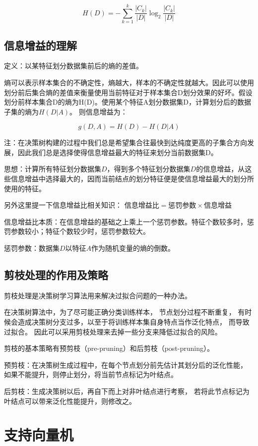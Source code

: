 $$
H(D)=-\sum_{k=1}^{k}\frac{|C_{k}|}{|D|}\log_{2}\frac{|C_{k}|}{|D|}
$$

\subsection{信息增益的理解}

定义：以某特征划分数据集前后的熵的差值。 

熵可以表示样本集合的不确定性，熵越大，样本的不确定性就越大。因此可以使用划分前后集合熵的差值来衡量使用当前特征对于样本集合D划分效果的好坏。假设划分前样本集合D的熵为H(D)。使用某个特征A划分数据集D，计算划分后的数据子集的熵为$H(D|A)$。 则信息增益为：

$$
g(D,A)=H(D)-H(D|A)
$$

注：在决策树构建的过程中我们总是希望集合往最快到达纯度更高的子集合方向发展，因此我们总是选择使得信息增益最大的特征来划分当前数据集D。  

思想：计算所有特征划分数据集$D$，得到多个特征划分数据集$D$的信息增益，从这些信息增益中选择最大的，因而当前结点的划分特征便是使信息增益最大的划分所使用的特征。  

另外这里提一下信息增益比相关知识： $\mbox{信息增益比}=\mbox{惩罚参数}\times\mbox{信息增益}$  

信息增益比本质：在信息增益的基础之上乘上一个惩罚参数。特征个数较多时，惩罚参数较小；特征个数较少时，惩罚参数较大。  

惩罚参数：数据集$D$以特征$A$作为随机变量的熵的倒数。

\subsection{剪枝处理的作用及策略}

剪枝处理是决策树学习算法用来解决过拟合问题的一种办法。

在决策树算法中，为了尽可能正确分类训练样本， 节点划分过程不断重复， 有时候会造成决策树分支过多，以至于将训练样本集自身特点当作泛化特点， 而导致过拟合。 因此可以采用剪枝处理来去掉一些分支来降低过拟合的风险。 

剪枝的基本策略有预剪枝（pre-pruning）和后剪枝（post-pruning）。

预剪枝：在决策树生成过程中，在每个节点划分前先估计其划分后的泛化性能， 如果不能提升，则停止划分，将当前节点标记为叶结点。 

后剪枝：生成决策树以后，再自下而上对非叶结点进行考察， 若将此节点标记为叶结点可以带来泛化性能提升，则修改之。

\section{支持向量机}

